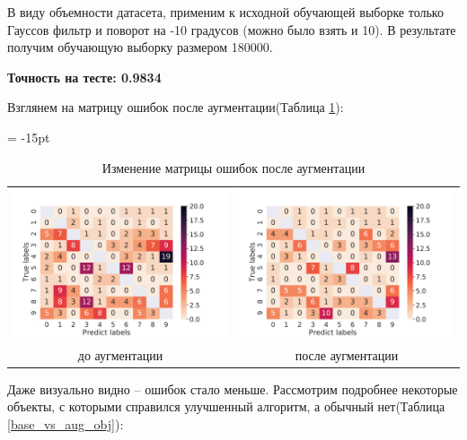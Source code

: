 \documentclass[12pt,fleqn]{article}
\begin{document}
В виду объемности датасета, применим к исходной обучающей выборке только Гауссов фильтр и поворот на -10 градусов (можно было взять и 10).
В результате получим обучающую выборку размером 180000.

\newpage
\textbf{Точность на тесте: 0.9834}

Взглянем на матрицу ошибок после аугментации(Таблица \ref{conf_matrix_aug}):

\begin{table}[htb]
    \centering
    \tabcolsep = -15pt
    \begin{tabular}{cc}
        \includegraphics[width=10cm]{task4.pdf} & \includegraphics[width=10cm]{task5_conf_mat.pdf}\\
        до аугментации & после аугментации 
    \end{tabular}
    \caption{Изменение матрицы ошибок после аугментации}
    \label{conf_matrix_aug}
\end{table}

Даже визуально видно -- ошибок стало меньше. Рассмотрим подробнее некоторые объекты, 
с которыми справился улучшенный алгоритм, а обычный нет(Таблица \ref{base_vs_aug_obj}):
\end{document}
